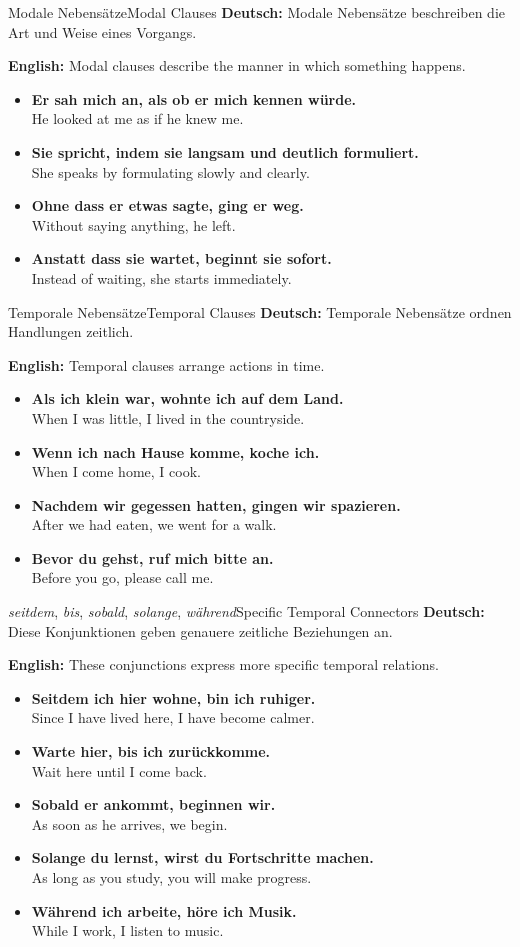 \documentclass[a4paper,11pt]{article}
\newcommand{\GermanText}[1]{\textbf{Deutsch: }#1\par}
\newcommand{\EnglishText}[1]{{\color{SoftGray}\textbf{English: }#1\par}}
\newcommand{\ExampleItem}[2]{\item \textbf{#1}\\{\color{SoftGray}#2}}
\begin{document}
\begin{grammarentry}{Modale Nebensätze}{Modal Clauses}
    \GermanText{Modale Nebensätze beschreiben die Art und Weise eines Vorgangs.}
    \EnglishText{Modal clauses describe the manner in which something happens.}
    \begin{exbox}
        \begin{itemize}
            \ExampleItem{Er sah mich an, als ob er mich kennen würde.}{He looked at me as if he knew me.}
            \ExampleItem{Sie spricht, indem sie langsam und deutlich formuliert.}{She speaks by formulating slowly and clearly.}
            \ExampleItem{Ohne dass er etwas sagte, ging er weg.}{Without saying anything, he left.}
            \ExampleItem{Anstatt dass sie wartet, beginnt sie sofort.}{Instead of waiting, she starts immediately.}
        \end{itemize}
    \end{exbox}
\end{grammarentry}

\begin{grammarentry}{Temporale Nebensätze}{Temporal Clauses}
    \GermanText{Temporale Nebensätze ordnen Handlungen zeitlich.}
    \EnglishText{Temporal clauses arrange actions in time.}
    \begin{exbox}
        \begin{itemize}
            \ExampleItem{Als ich klein war, wohnte ich auf dem Land.}{When I was little, I lived in the countryside.}
            \ExampleItem{Wenn ich nach Hause komme, koche ich.}{When I come home, I cook.}
            \ExampleItem{Nachdem wir gegessen hatten, gingen wir spazieren.}{After we had eaten, we went for a walk.}
            \ExampleItem{Bevor du gehst, ruf mich bitte an.}{Before you go, please call me.}
        \end{itemize}
    \end{exbox}
\end{grammarentry}

\begin{grammarentry}{\textit{seitdem}, \textit{bis}, \textit{sobald}, \textit{solange}, \textit{während}}{Specific Temporal Connectors}
    \GermanText{Diese Konjunktionen geben genauere zeitliche Beziehungen an.}
    \EnglishText{These conjunctions express more specific temporal relations.}
    \begin{exbox}
        \begin{itemize}
            \ExampleItem{Seitdem ich hier wohne, bin ich ruhiger.}{Since I have lived here, I have become calmer.}
            \ExampleItem{Warte hier, bis ich zurückkomme.}{Wait here until I come back.}
            \ExampleItem{Sobald er ankommt, beginnen wir.}{As soon as he arrives, we begin.}
            \ExampleItem{Solange du lernst, wirst du Fortschritte machen.}{As long as you study, you will make progress.}
            \ExampleItem{Während ich arbeite, höre ich Musik.}{While I work, I listen to music.}
        \end{itemize}
    \end{exbox}
\end{grammarentry}
\end{document}

